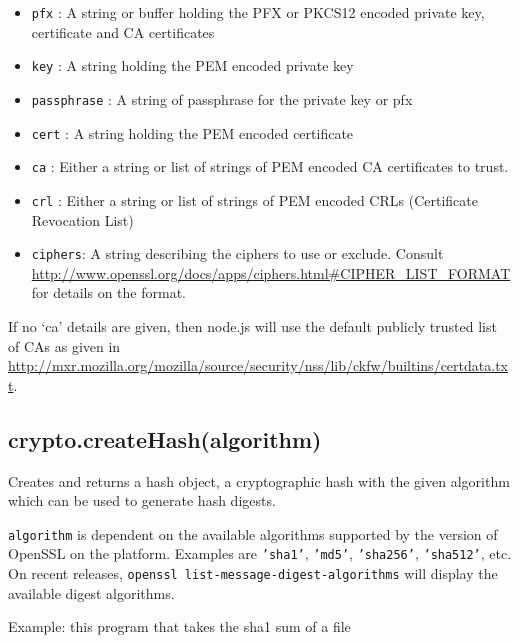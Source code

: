 \begin{itemize}
\itemsep1pt\parskip0pt
\item
  \texttt{pfx} : A string or buffer holding the PFX or PKCS12 encoded
  private key, certificate and CA certificates
\item
  \texttt{key} : A string holding the PEM encoded private key
\item
  \texttt{passphrase} : A string of passphrase for the private key or
  pfx
\item
  \texttt{cert} : A string holding the PEM encoded certificate
\item
  \texttt{ca} : Either a string or list of strings of PEM encoded CA
  certificates to trust.
\item
  \texttt{crl} : Either a string or list of strings of PEM encoded CRLs
  (Certificate Revocation List)
\item
  \texttt{ciphers}: A string describing the ciphers to use or exclude.
  Consult
  \url{http://www.openssl.org/docs/apps/ciphers.html\#CIPHER_LIST_FORMAT}
  for details on the format.
\end{itemize}

If no `ca' details are given, then node.js will use the default publicly
trusted list of CAs as given in
\url{http://mxr.mozilla.org/mozilla/source/security/nss/lib/ckfw/builtins/certdata.txt}.

\subsection{crypto.createHash(algorithm)}\label{crypto.createhashalgorithm}

Creates and returns a hash object, a cryptographic hash with the given
algorithm which can be used to generate hash digests.

\texttt{algorithm} is dependent on the available algorithms supported by
the version of OpenSSL on the platform. Examples are \texttt{'sha1'},
\texttt{'md5'}, \texttt{'sha256'}, \texttt{'sha512'}, etc. On recent
releases, \texttt{openssl list-message-digest-algorithms} will display
the available digest algorithms.

Example: this program that takes the sha1 sum of a file

